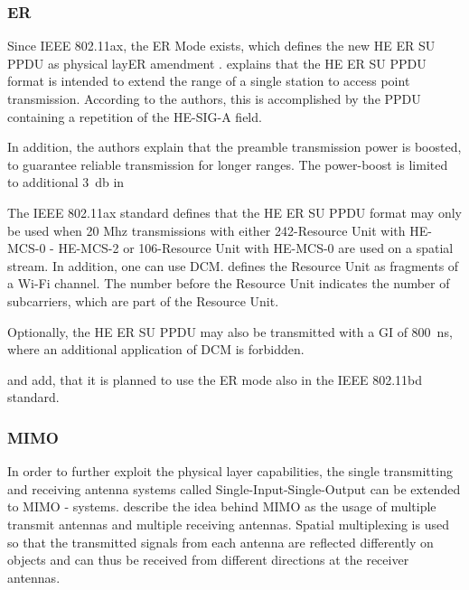\subsubsection*{\acf{ER}}
Since IEEE 802.11ax, the \ac{ER} Mode exists, which defines the new \ac{HE} \ac{ER} SU \ac{PPDU} as physical lay\ac{ER} amendment
\cite{noauthor_ieee_2021,afaqui_ieee_2017} .
\textcite{deng_ieee_2017} explains that the \ac{HE} \ac{ER} SU \ac{PPDU} format is intended to extend the range of
a single station to access point transmission.
According to the authors, this is accomplished by the \ac{PPDU} containing a repetition of the HE-SIG-A field.

In addition, the authors explain that the preamble transmission power is boosted,
to guarantee reliable transmission for longer ranges.
The power-boost is limited to additional \SI{3}{\decibel}
in \cite{noauthor_ieee_2021,jacob_system-level_2020}

The IEEE 802.11ax \cite{noauthor_ieee_2021} standard defines that the \ac{HE} \ac{ER} SU \ac{PPDU} format may only be used
when 20 Mhz transmissions with either 242-Resource Unit with HE-MCS-0 - HE-MCS-2 or 106-Resource Unit with HE-MCS-0 are used on a spatial stream.
In addition, one can use \ac{DCM}.
\textcite{sauter_wireless_2022} defines the Resource Unit as fragments of a Wi-Fi channel. The number before the Resource Unit
indicates the number of subcarriers, which are part of the Resource Unit.

Optionally, the \ac{HE} \ac{ER} SU \ac{PPDU} may also be transmitted with a \ac{GI} of \SI{800}{\nano\second},
where an additional application of \ac{DCM} is forbidden.

\textcite{jacob_system-level_2020} and \textcite{triwinarko_phy_2021} add, that it is planned to use
the \ac{ER} mode also in the IEEE 802.11bd standard.

\subsubsection*{\acf{MIMO}}
In order to further exploit the physical layer capabilities, the single transmitting and receiving antenna systems called Single-Input-Single-Output can be extended to \ac{MIMO} - systems.
\textcite{sauter_wireless_2022} describe the idea behind \ac{MIMO} as the usage of multiple transmit antennas and multiple receiving antennas. Spatial multiplexing is used so that the transmitted signals
from each antenna are reflected differently on objects and can thus be received from different directions at the receiver antennas.

